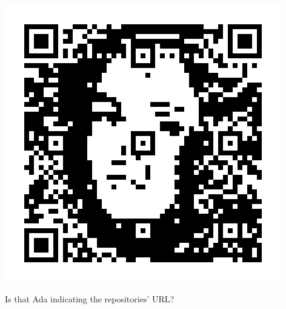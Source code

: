 \begin{frame}
\begin{columns}
\begin{column}{0.25\textwidth}
\centering
\includegraphics[width=\columnwidth]{qart.png}
\caption{Is that Ada indicating the repositories' URL?}
\end{column}

\end{columns}
\normalsize
\end{frame}

